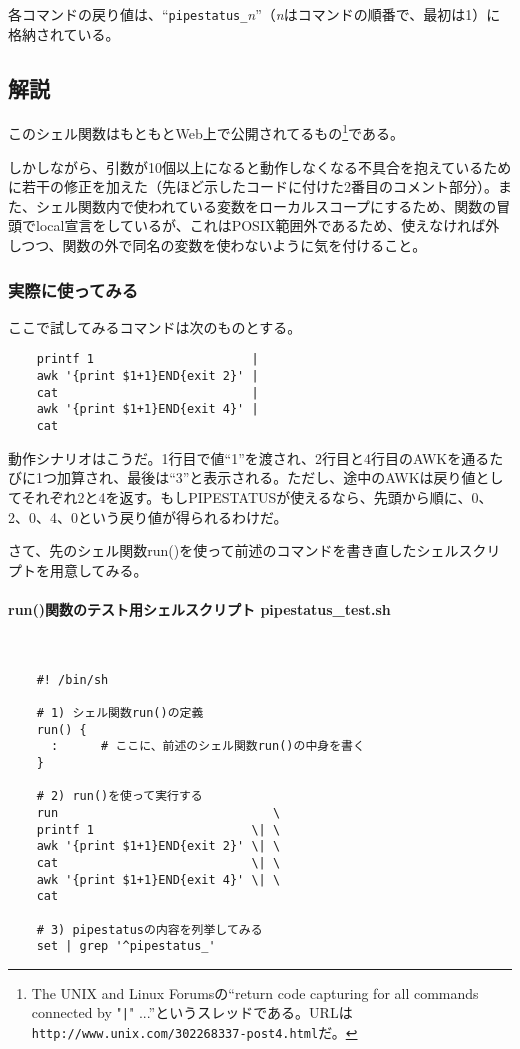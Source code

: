 各コマンドの戻り値は、``\verb|pipestatus_|\textit{n}''（\textit{n}はコマンドの順番で、最初は1）に格納されている。

\subsection*{解説}

このシェル関数はもともとWeb上で公開されてるもの\footnote{The UNIX and Linux Forumsの``return code capturing for all commands connected by "\verb!|!" ...''というスレッドである。URLは\verb|http://www.unix.com/302268337-post4.html|だ。}である。

しかしながら、引数が10個以上になると動作しなくなる不具合を抱えているために若干の修正を加えた（先ほど示したコードに付けた2番目のコメント部分）。また、シェル関数内で使われている変数をローカルスコープにするため、関数の冒頭でlocal宣言をしているが、これはPOSIX範囲外であるため、使えなければ外しつつ、関数の外で同名の変数を使わないように気を付けること。

\subsubsection*{実際に使ってみる}

ここで試してみるコマンドは次のものとする。\\
\begin{frameboxit}{160.0mm}
\begin{verbatim}
	printf 1                      |
	awk '{print $1+1}END{exit 2}' |
	cat                           |
	awk '{print $1+1}END{exit 4}' |
	cat
\end{verbatim}
\end{frameboxit}

動作シナリオはこうだ。1行目で値``1''を渡され、2行目と4行目のAWKを通るたびに1つ加算され、最後は``3''と表示される。ただし、途中のAWKは戻り値としてそれぞれ2と4を返す。もしPIPESTATUSが使えるなら、先頭から順に、0、2、0、4、0という戻り値が得られるわけだ。

さて、先のシェル関数run()を使って前述のコマンドを書き直したシェルスクリプトを用意してみる。
\paragraph{run()関数のテスト用シェルスクリプト pipestatus\_{}test.sh}　\\
\begin{frameboxit}{160.0mm}
\begin{verbatim}
	#! /bin/sh

	# 1) シェル関数run()の定義
	run() {
	  :      # ここに、前述のシェル関数run()の中身を書く
	}

	# 2) run()を使って実行する
	run                              \
	printf 1                      \| \
	awk '{print $1+1}END{exit 2}' \| \
	cat                           \| \
	awk '{print $1+1}END{exit 4}' \| \
	cat

	# 3) pipestatusの内容を列挙してみる
	set | grep '^pipestatus_'
\end{verbatim}
\end{frameboxit}


